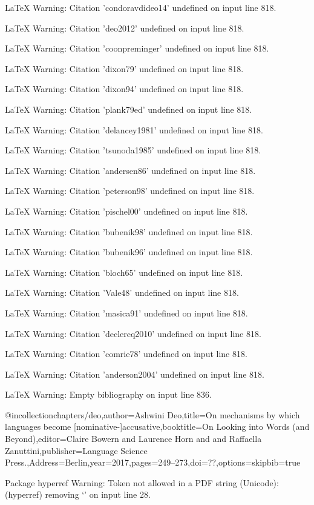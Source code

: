 LaTeX Warning: Citation 'condoravdideo14' undefined on input line 818.


LaTeX Warning: Citation 'deo2012' undefined on input line 818.


LaTeX Warning: Citation 'coonpreminger' undefined on input line 818.


LaTeX Warning: Citation 'dixon79' undefined on input line 818.


LaTeX Warning: Citation 'dixon94' undefined on input line 818.


LaTeX Warning: Citation 'plank79ed' undefined on input line 818.


LaTeX Warning: Citation 'delancey1981' undefined on input line 818.


LaTeX Warning: Citation 'tsunoda1985' undefined on input line 818.


LaTeX Warning: Citation 'andersen86' undefined on input line 818.


LaTeX Warning: Citation 'peterson98' undefined on input line 818.


LaTeX Warning: Citation 'pischel00' undefined on input line 818.


LaTeX Warning: Citation 'bubenik98' undefined on input line 818.


LaTeX Warning: Citation 'bubenik96' undefined on input line 818.


LaTeX Warning: Citation 'bloch65' undefined on input line 818.


LaTeX Warning: Citation 'Vale48' undefined on input line 818.


LaTeX Warning: Citation 'masica91' undefined on input line 818.


LaTeX Warning: Citation 'declercq2010' undefined on input line 818.


LaTeX Warning: Citation 'comrie78' undefined on input line 818.


LaTeX Warning: Citation 'anderson2004' undefined on input line 818.


LaTeX Warning: Empty bibliography on input line 836.

@incollection{chapters/deo,author={Ashwini Deo},title={{On mechanisms by which languages become [nominative-]accusative}},booktitle={{On Looking into Words (and Beyond)}},editor={Claire Bowern and  Laurence Horn and  and Raffaella Zanuttini},publisher={Language Science Press.},Address={Berlin},year=2017,pages={249--273},doi={??},options={skipbib=true}}

Package hyperref Warning: Token not allowed in a PDF string (Unicode):
(hyperref)                removing `\newline' on input line 28.


